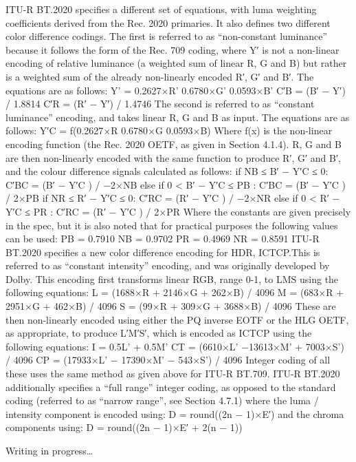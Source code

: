 ITU-R BT.2020 specifies a different set of equations, with luma weighting coefficients derived from the Rec. 2020 primaries. It also defines two different color difference codings.
The first is referred to as “non-constant luminance” because it follows the form of the Rec. 709 coding, where Y′ is not a non-linear encoding of relative luminance (a weighted sum of linear R, G and B) but rather is a weighted sum of the already non-linearly encoded R′, G′ and B′. The equations are as follows:
	Y' = 0.2627×R'  0.6780×G'  0.0593×B'
	C′B = (B′ − Y′) / 1.8814
	C′R = (R′ − Y′) / 1.4746
The second is referred to as “constant luminance” encoding, and takes linear R, G and B as input. The equations are as follows:
	Y′C = f(0.2627×R  0.6780×G  0.0593×B)
Where f(x) is the non-linear encoding function (the Rec. 2020 OETF, as given in Section 4.1.4). R, G and B are then non-linearly encoded with the same function to produce R′, G′ and B′, and the colour difference signals calculated as follows:
	if NB ≤ B′ − Y′C ≤ 0:
C′BC = (B′ − Y′C ) / −2×NB
else if 0 < B′ − Y′C ≤ PB :
	C′BC = (B′ − Y′C ) / 2×PB
	if NR ≤ R′ − Y′C ≤ 0:
C′RC = (R′ − Y′C ) / −2×NR
else if 0 < R′ − Y′C ≤ PR :
	C′RC = (R′ − Y′C ) / 2×PR
Where the constants are given precisely in the spec, but it is also noted that for practical purposes the following values can be used:
	PB = 0.7910
NB = 0.9702
PR = 0.4969
NR = 0.8591
ITU-R BT.2020 specifies a new color difference encoding for HDR,  ICTCP.This is referred to as “constant intensity” encoding, and was originally developed by Dolby. This encoding first transforms linear RGB, range 0-1, to LMS using the following equations:
	L = (1688×R + 2146×G + 262×B) / 4096
M = (683×R + 2951×G + 462×B) / 4096
S = (99×R + 309×G + 3688×B) / 4096
These are then non-linearly encoded using either the PQ inverse EOTF or the HLG OETF, as appropriate, to produce L′M′S′, which is encoded as  ICTCP using the following equations:
	I = 0.5L' + 0.5M'
	CT = (6610×L' −13613×M' + 7003×S') / 4096
CP = (17933×L' − 17390×M' − 543×S') / 4096
Integer coding of all these uses the same method as given above for ITU-R BT.709. ITU-R BT.2020 additionally specifies a “full range” integer coding, as opposed to the standard coding (referred to as “narrow range”, see Section 4.7.1) where the luma / intensity component is encoded using:
	D = round((2n − 1)×E′)
and the chroma components using:
	D = round((2n − 1)×E′ + 2(n − 1))


Writing in progress…

